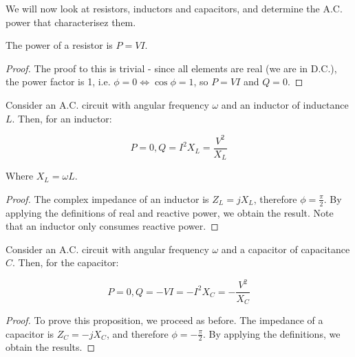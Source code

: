\documentclass{article}
\begin{document}
We will now look at resistors, inductors and capacitors, and determine the A.C. power that characterisez them.

\begin{proposition}
    The power of a resistor is $P = VI$.
\end{proposition}

\begin{proof}
    The proof to this is trivial - since all elements are real (we are in D.C.), the power factor is 1, i.e. $\phi = 0 \iff \cos{\phi} = 1$, so $P = VI$ and $Q = 0$.
\end{proof}

\begin{proposition}
    Consider an A.C. circuit with angular frequency $\omega$ and an inductor of inductance $L$. Then, for an inductor:

    \[ P = 0, Q = I^2X_L = \frac{V^2}{X_L} \]

    Where $X_L = \omega L$.
\end{proposition}

\begin{proof}
    The complex impedance of an inductor is $Z_L = jX_L$, therefore $\phi = \frac{\pi}{2}$. By applying the definitions of real and reactive power, we obtain the result. Note that an inductor only consumes reactive power.
\end{proof}

\begin{proposition}
    Consider an A.C. circuit with angular frequency $\omega$ and a capacitor of capacitance $C$. Then, for the capacitor:

    \[ P = 0, Q = -VI = -I^2X_C = -\frac{V^2}{X_C} \]
\end{proposition}

\begin{proof}
    To prove this proposition, we proceed as before. The impedance of a capacitor is $Z_C = -jX_C$, and therefore $\phi = -\frac{\pi}{2}$. By applying the definitions, we obtain the results.
\end{proof}
\end{document}
